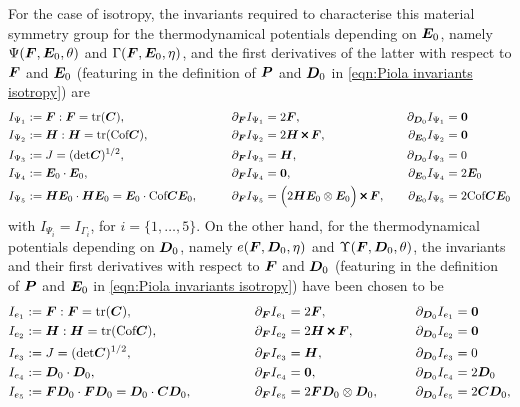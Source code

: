 For the case of isotropy, the invariants required to characterise this material symmetry group for the thermodynamical potentials depending on $\boldsymbol{E}_0$, namely $\Psi(\boldsymbol{F},\boldsymbol{E}_0,\theta)$ and $\Gamma(\boldsymbol{F},\boldsymbol{E}_0,\eta)$, and the first derivatives of the latter with respect to $\boldsymbol{F}$ and $\boldsymbol{E}_0$ (featuring in the definition of $\boldsymbol{P}$ and $\boldsymbol{D}_0$ in \eqref{eqn:Piola invariants isotropy}) are
%
\begin{equation}\label{eqn:table isotropy}
\begin{aligned}	
I_{\Psi_1} &:= \vect{F}:\vect{F}=\text{tr}(\vect{C}),\quad   &\partial_{\vect{F}}I_{\Psi_1}&=2\vect{F},\quad   &\partial_{\vect{D}_0}I_{\Psi_1}&=\vect{0}\\
%
I_{\Psi_2} &:= \vect{H}:\vect{H}=\text{tr}(\text{Cof}\vect{C}),\quad   &\partial_{\vect{F}}I_{\Psi_2}&=2\vect{H}\Cross \vect{F},\quad   &\partial_{\vect{E}_0}I_{\Psi_2}&=\vect{0}\\
%
I_{\Psi_3}&:=J = (\text{det}\vect{C})^{1/2},&\quad   \partial_{\vect{F}}I_{\Psi_3}&=\vect{H},\quad   &\partial_{\vect{D}_0}I_{\Psi_3}&=0\\
%
I_{\Psi_4} &:= \vect{E}_0\cdot\vect{E}_0,\quad   &\partial_{\vect{F}}I_{\Psi_4}&=\vect{0},\quad   &\partial_{\vect{E}_0}I_{\Psi_4}&=2\vect{E}_0\\
%
I_{\Psi_5} &:= \vect{HE}_0\cdot \vect{HE}_0=\vect{E}_0\cdot \text{Cof}\vect{C}\vect{E}_0,\quad   &\partial_{\vect{F}}I_{\Psi_5}&=\Big(2\vect{H}\vect{E}_0\otimes\vect{E}_0\Big)\Cross\vect{F},\quad   &\partial_{\vect{E}_0}I_{\Psi_5}&=2\text{Cof}\vect{C}\vect{E}_0
%		
\end{aligned}
\end{equation}
%
with $I_{\Psi_i}=I_{\Gamma_i}$, for $i=\{1,\dots,5\}$. On the other hand, for the thermodynamical potentials depending on $\boldsymbol{D}_0$, namely $e(\boldsymbol{F},\boldsymbol{D}_0,\eta)$ and $\Upsilon(\boldsymbol{F},\boldsymbol{D}_0,\theta)$, the invariants and their first derivatives with respect to $\boldsymbol{F}$ and $\boldsymbol{D}_0$ (featuring in the definition of $\boldsymbol{P}$ and $\boldsymbol{E}_0$ in \eqref{eqn:Piola invariants isotropy}) have been chosen to be
%
\begin{equation}\label{eqn:table isotropy 2}
\begin{aligned}	
I_{e_1} &:= \vect{F}:\vect{F}=\text{tr}(\vect{C}),\qquad   &\partial_{\vect{F}}I_{e_1}&=2\vect{F},\qquad   &\partial_{\vect{D}_0}I_{e_1}&=\vect{0}\\
%
I_{e_2} &:= \vect{H}:\vect{H}=\text{tr}(\text{Cof}\vect{C}),\qquad   &\partial_{\vect{F}}I_{e_2}&=2\vect{H}\Cross \vect{F},\qquad   &\partial_{\vect{D}_0}I_{e_2}&=\vect{0}\\
%
I_{e_3}&:=J = (\text{det}\vect{C})^{1/2},&\qquad   \partial_{\vect{F}}I_{e_3}&=\vect{H},\qquad   &\partial_{\vect{D}_0}I_{e_3}&=0\\
%
I_{e_4} &:= \vect{D}_0\cdot\vect{D}_0,\qquad   &\partial_{\vect{F}}I_{e_4}&=\vect{0},\qquad   &\partial_{\vect{D}_0}I_{e_4}&=2\vect{D}_0\\
%
I_{e_5} &:= \vect{FD}_0\cdot \vect{FD}_0=\vect{D}_0\cdot \vect{C}\vect{D}_0,\qquad   &\partial_{\vect{F}}I_{e_5}&=2\vect{F}\vect{D}_0\otimes\vect{D}_0,\qquad   &\partial_{\vect{D}_0}I_{e_5}&=2\vect{C}\vect{D}_0,
%		
\end{aligned}
\end{equation}
